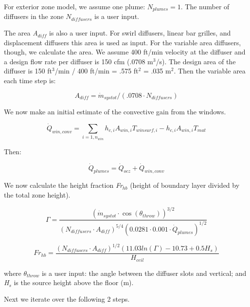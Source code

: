 {For exterior zone model, we assume one plume: \({N_{plumes}} = 1\). The number of diffusers in the zone \({N_{diffusers}}\) is a user input.

The area \emph{A\(_{diff}\)} is also a user input. For swirl diffusers, linear bar grilles, and displacement diffusers this area is used as input. For the variable area diffusers, though, we calculate the area. We assume 400 ft/min velocity at the diffuser and a design flow rate per diffuser is 150 cfm (.0708 m\(^{3}\)/s). The design area of the diffuser is 150 ft\(^{3}\)/min / 400 ft/min = .575 ft\(^{2}\) = .035 m\(^{2}\). Then the variable area each time step is:

\begin{equation}
{A_{diff}} = {\dot m_{systot}}/(.0708\cdot {N_{diffusers}})
\end{equation}

We now make an initial estimate of the convective gain from the windows.

\begin{equation}
{\dot Q_{win,conv}} = \sum\limits_{i = 1,{n_{win}}} {{h_{c,i}}} {A_{win,i}}{T_{winsurf,i}} - {h_{c,i}}{A_{win,i}}{T_{mat}}
\end{equation}

Then:

\begin{equation}
{\dot Q_{plumes}} = {\dot Q_{ocz}} + {\dot Q_{win,conv}}
\end{equation}

We now calculate the height fraction \emph{Fr\(_{hb}\)} (height of boundary layer divided by the total zone height).

\begin{equation}
\Gamma  = \frac{{{{({{\dot m}_{systot}}\cdot \cos ({\theta_{throw}}))}^{3/2}}}}{{{{({N_{diffusers}}\cdot {A_{diff}})}^{5/4}}{{(0.0281\cdot 0.001\cdot {{\dot Q}_{plumes}})}^{1/2}}}}
\end{equation}

\begin{equation}
F{r_{hb}} = \frac{{{{({N_{diffusers}}\cdot {A_{diff}})}^{1/2}}(11.03ln(\Gamma ) - 10.73 + 0.5{H_s})}}{{{H_{ceil}}}}
\end{equation}

where \emph{\(\theta_{throw}\)} is a user input: the angle between the diffuser slots and vertical; and \emph{H\(_{s}\)} is the source height above the floor (m).

Next we iterate over the following 2 steps.

}
